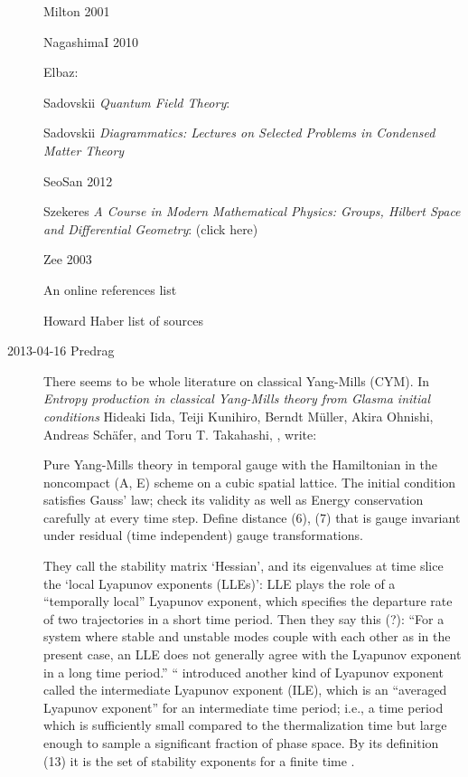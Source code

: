 \begin{description}
Milton 2001 

NagashimaI 2010 

Elbaz: 

Sadovskii {\em Quantum Field Theory}:

Sadovskii
{\em Diagrammatics: Lectures on Selected Problems in Condensed Matter Theory}

SeoSan 2012 

Szekeres {\em A Course in Modern Mathematical Physics: Groups,
Hilbert Space and Differential Geometry}:
 { (click here)}

Zee 2003 

{An online references list}

Howard Haber  {list of sources}

\item[2013-04-16  Predrag] There seems to be whole literature on
classical Yang-Mills (CYM). In
{\em Entropy production in classical Yang-Mills theory from Glasma
initial conditions} Hideaki Iida,  Teiji Kunihiro,  Berndt M\"uller,
Akira Ohnishi,  Andreas Sch\"afer,  and Toru T. Takahashi,
, %
write:

Pure Yang-Mills theory in temporal gauge with the Hamiltonian in the
noncompact (A, E) scheme on a cubic spatial lattice. The initial
condition satisfies Gauss' law; check its validity as well as Energy
conservation carefully at every time step. Define distance (6), (7) that
is gauge invariant under residual (time independent) gauge transformations.

                                                    \inCB
They call the stability matrix `Hessian', and its eigenvalues at time
slice the `local Lyapunov exponents (LLEs)': LLE plays the
role of a ``temporally local'' Lyapunov exponent, which specifies the
departure rate of two trajectories in a short time period. Then they say
this (?): ``For a system where stable and unstable modes couple with each
other as in the present case, an LLE does not generally agree with the
Lyapunov exponent in a long time period.'' `` introduced
another kind of Lyapunov exponent called the intermediate Lyapunov
exponent (ILE), which is an ``averaged Lyapunov exponent'' for an
intermediate time period; i.e., a time period which is sufficiently small
compared to the thermalization time but large enough to sample a
significant fraction of phase space. By its definition (13) it
is the set of stability exponents for a finite time \jacobianM.


\end{description}
